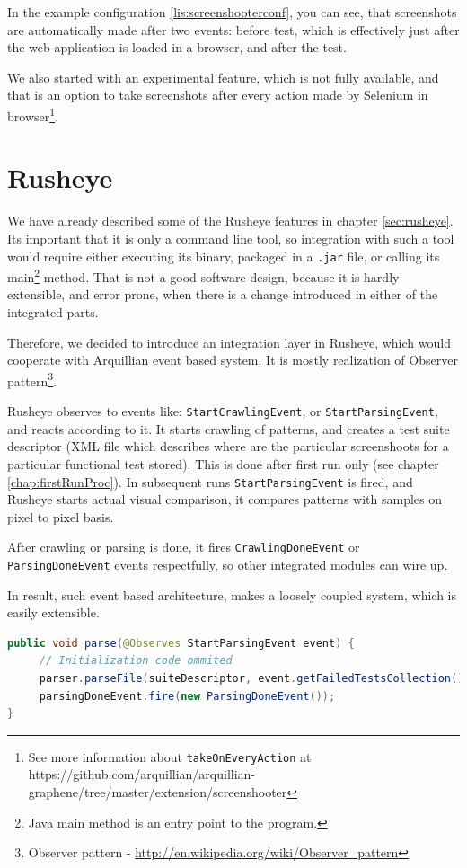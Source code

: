 \documentclass[11pt,oneside,final]{fithesis2}
\begin{document}
In the example configuration \ref{lis:screenshooterconf}, you can see, that screenshots are automatically 
made after two events: before test, which is effectively just after the web application is loaded in 
a browser, and after the test. 

We also started with an experimental feature, which is not fully available, and that is an option
to take screenshots after every action made by Selenium in browser\footnote{See more information 
about \texttt{takeOnEveryAction} at https://github.com/arquillian/arquillian-graphene/tree/master/extension/screenshooter}.
  
\section{Rusheye}
We have already described some of the Rusheye features in chapter \ref{sec:rusheye}. Its important that it
is only a command line tool, so integration with such a tool would require either executing its binary,
packaged in a \texttt{.jar} file, or calling its main\footnote{Java main method is an entry point
to the program.} method. That is not a good software design, because it is hardly extensible, and error prone,
when there is a change introduced in either of the integrated parts.

Therefore, we decided to introduce an integration layer in Rusheye, which would cooperate with Arquillian event based system.
It is mostly realization of Observer pattern\footnote{Observer pattern - \url{http://en.wikipedia.org/wiki/Observer_pattern}}.

Rusheye observes to events like: \texttt{StartCrawlingEvent}, or \texttt{StartParsingEvent}, and reacts according to it. It starts
crawling of patterns, and creates a test suite descriptor (XML file which describes where are the particular screenshoots for a particular
functional test stored). This is done after first run only (see chapter \ref{chap:firstRunProc}). In subsequent runs \texttt{StartParsingEvent}
is fired, and Rusheye starts actual visual comparison, it compares patterns with samples on pixel to pixel basis.

After crawling or parsing is done, it fires \texttt{CrawlingDoneEvent} or \texttt{ParsingDoneEvent} events respectfully, so other integrated
modules can wire up.

In result, such event based architecture, makes a loosely coupled system, which is easily extensible.

\begin{lstlisting}[caption=Example of StartParsingEvent observer,label=lis:startParsingObserver,language=java, breaklines=true]
public void parse(@Observes StartParsingEvent event) {
     // Initialization code ommited
     parser.parseFile(suiteDescriptor, event.getFailedTestsCollection());
     parsingDoneEvent.fire(new ParsingDoneEvent());
}
\end{lstlisting}
  
\end{document}
